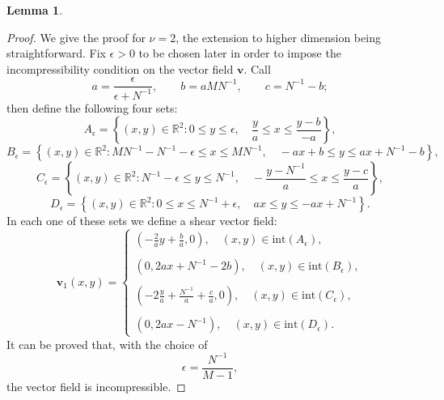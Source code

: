 \documentclass[12 pt]{article}
\theoremstyle{definition} \newtheorem{definition}{Definition}[section]
\theoremstyle{definition} \newtheorem{remark}[definition]{Remark}
\theoremstyle{plain} \newtheorem{lemma}[definition]{Lemma}
\theoremstyle{plain} \newtheorem{proposition}[definition]{Proposition}
\theoremstyle{plain} \newtheorem{theorem}[definition]{Theorem}
\theoremstyle{plain} \newtheorem{corollary}[definition]{Corollary}
\theoremstyle{definition} \newtheorem{example}[definition]{Example}
\theoremstyle{definition} \newtheorem{assumption}[definition]{Assumption}
\theoremstyle{definition} \newtheorem{conjecture}[definition]{Conjecture}
\newcommand{\1}{\mathbbm 1}
\numberwithin{equation}{section}
\begin{document}
\begin{appendix}
\begin{lemma}
\end{lemma}
\begin{proof}
    We give the proof for $\nu=2$, the extension to higher dimension being straightforward.  Fix $\epsilon>0$ to be chosen later in order to impose the incompressibility condition on the vector field $\mathbf v$. Call
    \begin{equation*}
        a=\frac{\epsilon}{\epsilon+N^{-1}},\qquad b=aMN^{-1},\qquad c=N^{-1}-b;
    \end{equation*}
    then define the following four sets:
     $$A_\epsilon=\left\lbrace (x,y)\in\mathbb R^2: 0\leq y\leq \epsilon,\quad \frac{y}{a}\leq x\leq \frac{y-b}{-a}\right\rbrace,$$
    $$B_\epsilon=\left\lbrace (x,y)\in\mathbb R^2: MN^{-1}-N^{-1}-\epsilon\leq x\leq MN^{-1}, \quad -ax+b\leq y\leq ax+N^{-1}-b\right\rbrace,$$
   $$C_\epsilon=\left\lbrace (x,y)\in\mathbb R^2: N^{-1}-\epsilon\leq y\leq N^{-1}, \quad -\frac{y-N^{-1}}{a}\leq x\leq \frac{y-c}{a}\right\rbrace,$$
    $$D_\epsilon=\left\lbrace (x,y)\in\mathbb R^2: 0\leq  x\leq N^{-1}+\epsilon, \quad ax\leq y\leq -ax+N^{-1}\right\rbrace.$$
    In each one of these sets we define a shear vector field: 
    \begin{equation}\label{eq:vect:field}
        {\mathbf v_1}(x,y)=\begin{cases}
            \left(-\frac{2}{a}y+\frac{b}{a},0\right),\quad (x,y)\in \text{int}(A_\epsilon), \\
            \\
\left(0,2ax+N^{-1}-2b\right),\quad (x,y)\in \text{int}(B_\epsilon), \\
             \\
             \left(-2\frac{y}{a}+\frac{N^{-1}}{a}+\frac{c}{a},0\right),\quad (x,y)\in \text{int}(C_\epsilon), \\
             \\
             \left(0, 2ax-N^{-1}\right),\quad (x,y)\in \text{int}(D_\epsilon). 
        \end{cases}
    \end{equation}
    It can be proved that, with the choice of
   \begin{equation*}
       \epsilon=\frac{N^{-1}}{M-1},
   \end{equation*}
   the vector field is incompressible.

\end{proof}
\end{appendix}
\end{document}
